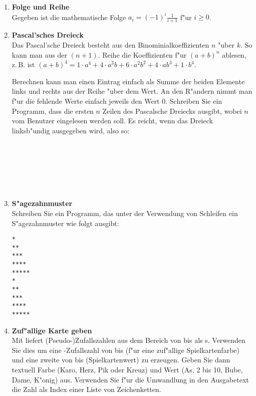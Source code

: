 \begin{enumerate}[1.]
\item \textbf{Folge und Reihe}\\
Gegeben ist die mathematische Folge $a_i = (-1)^i \frac{1}{i+1}$ f"ur $i \ge 0$.

\item \textbf{Pascal'sches Dreieck}\\
Das Pascal'sche Dreieck besteht aus den Binominialkoeffizienten $n$ "uber $k$.
So kann man aus der $(n+1)$. Reihe die Koeffizienten f"ur $(a+b)^n$ ablesen, 
z.\,B. ist  
$(a+b)^4 = 1\cdot a^4+4\cdot a^3b +6\cdot a^2b^2+4\cdot ab^3+1\cdot b^4$.

Berechnen kann man einen Eintrag einfach als Summe der beiden Elemente
links und rechts aus der Reihe "uber dem Wert. An den R"andern nimmt
man f"ur die fehlende Werte einfach jeweils den Wert 0. Schreiben Sie
ein Programm, dass die ersten $n$ Zeilen des Pascalsche Dreiecks
ausgibt, wobei $n$ vom Benutzer eingelesen werden soll. Es reicht,
wenn das Dreieck linksb"undig ausgegeben wird, also so:

\noindent
{}\\
\\
\\
\\
\\


\item \textbf{S"agezahnmuster}\\
Schreiben Sie ein Programm, das unter der Verwendung von Schleifen ein 
S"agezahnmuster wie folgt ausgibt:
{\color{blue} 
\begin{verbatim}
*
**
***
****
*****
*
**
***
****
*****
\end{verbatim}}



\item \textbf{Zuf"allige Karte geben}\\
Mit  liefert 
(Pseudo-)Zufallszahlen aus dem Bereich von  bis 
als s.  Verwenden Sie dies um eine -Zufallszahl von
 bis  (f"ur eine zuf"allige Spielkartenfarbe) und eine
zweite von  bis  (Spielkartenwert) zu erzeugen. Geben Sie
dann textuell Farbe (Karo, Herz, Pik oder Kreuz) und Wert (As, 2 bis
10, Bube, Dame, K"onig) aus.  Verwenden Sie f"ur die Umwandlung in den
Ausgabetext die Zahl als Index einer Liste von Zeichenketten.



\end{enumerate}
